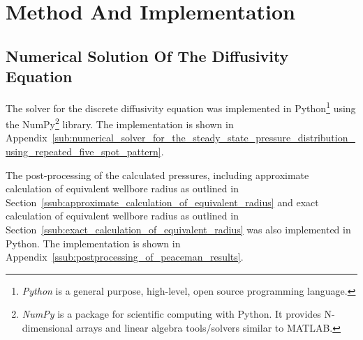 
\section{Method And Implementation} %
\label{sec:method}

\subsection{Numerical Solution Of The Diffusivity Equation} %
\label{sub:numerical_solution_of_the_diffusivity_equation}
The solver for the discrete diffusivity equation was implemented in Python\footnote{\emph{Python} is a general purpose, high-level, open source programming language.} using the NumPy\footnote{\emph{NumPy} is a package for scientific computing with Python. It provides N-dimensional arrays and linear algebra tools/solvers similar to MATLAB.} library. The implementation is shown in Appendix~\ref{sub:numerical_solver_for_the_steady_state_pressure_distribution_using_repeated_five_spot_pattern}.

The post-processing of the calculated pressures, including approximate calculation of equivalent wellbore radius as outlined in Section~\ref{ssub:approximate_calculation_of_equivalent_radius} and exact calculation of equivalent wellbore radius as outlined in Section~\ref{ssub:exact_calculation_of_equivalent_radius} was also implemented in Python. The implementation is shown in Appendix~\ref{ssub:postprocessing_of_peaceman_results}.


